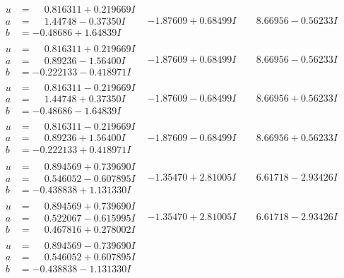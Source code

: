 \documentclass[1p]{elsarticle_modified}
\theoremstyle{definition}
\begin{document}
$$\begin{array}{c|c|c}
\begin{aligned}
u &= \phantom{-}0.816311 + 0.219669 I \\
a &= \phantom{-}1.44748 - 0.37350 I \\
b &= -0.48686 + 1.64839 I\end{aligned}
 & -1.87609 + 0.68499 I & \phantom{-}8.66956 - 0.56233 I \\ \hline\begin{aligned}
u &= \phantom{-}0.816311 + 0.219669 I \\
a &= \phantom{-}0.89236 - 1.56400 I \\
b &= -0.222133 - 0.418971 I\end{aligned}
 & -1.87609 + 0.68499 I & \phantom{-}8.66956 - 0.56233 I \\ \hline\begin{aligned}
u &= \phantom{-}0.816311 - 0.219669 I \\
a &= \phantom{-}1.44748 + 0.37350 I \\
b &= -0.48686 - 1.64839 I\end{aligned}
 & -1.87609 - 0.68499 I & \phantom{-}8.66956 + 0.56233 I \\ \hline\begin{aligned}
u &= \phantom{-}0.816311 - 0.219669 I \\
a &= \phantom{-}0.89236 + 1.56400 I \\
b &= -0.222133 + 0.418971 I\end{aligned}
 & -1.87609 - 0.68499 I & \phantom{-}8.66956 + 0.56233 I \\ \hline\begin{aligned}
u &= \phantom{-}0.894569 + 0.739690 I \\
a &= \phantom{-}0.546052 - 0.607895 I \\
b &= -0.438838 + 1.131330 I\end{aligned}
 & -1.35470 + 2.81005 I & \phantom{-}6.61718 - 2.93426 I \\ \hline\begin{aligned}
u &= \phantom{-}0.894569 + 0.739690 I \\
a &= \phantom{-}0.522067 - 0.615995 I \\
b &= \phantom{-}0.467816 + 0.278002 I\end{aligned}
 & -1.35470 + 2.81005 I & \phantom{-}6.61718 - 2.93426 I \\ \hline\begin{aligned}
u &= \phantom{-}0.894569 - 0.739690 I \\
a &= \phantom{-}0.546052 + 0.607895 I \\
b &= -0.438838 - 1.131330 I\end{aligned}

\end{array}$$
\end{document}

